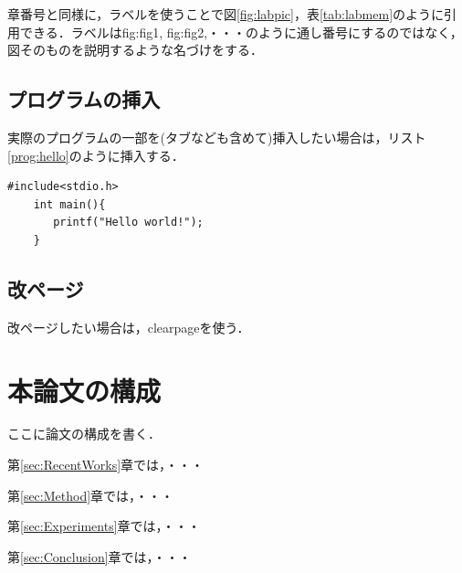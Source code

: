 章番号と同様に，ラベルを使うことで図\ref{fig:labpic}，表\ref{tab:labmem}のように引用できる．ラベルはfig:fig1, fig:fig2,・・・のように通し番号にするのではなく，図そのものを説明するような名づけをする．

\subsection{プログラムの挿入}\label{sec:program}
実際のプログラムの一部を(タブなども含めて)挿入したい場合は，リスト\ref{prog:hello}のように挿入する．
\begin{lstlisting}[caption=C言語で"Hello world!"を出力するプログラム,label=prog:hello]
    #include<stdio.h>
    int main(){
       printf("Hello world!");
    }
\end{lstlisting}

\subsection{改ページ}\label{sec:改ページ}
改ページしたい場合は，clearpageを使う．
\clearpage

\section{本論文の構成}\label{sec:本論文の構成}

ここに論文の構成を書く．

第\ref{sec:RecentWorks}章では，・・・

第\ref{sec:Method}章では，・・・

第\ref{sec:Experiments}章では，・・・

第\ref{sec:Conclusion}章では，・・・


